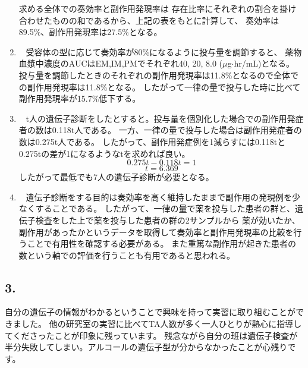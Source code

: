 \documentclass[a4paper,papersize,dvipdfmx]{jsarticle}
\newcommand{\mon}[1]{\item[({#1})] \ }
\begin{document}
\begin{enumerate}
求める全体での奏効率と副作用発現率は
存在比率にそれぞれの割合を掛け合わせたものの和であるから、上記の表をもとに計算して、
奏効率は89.5\%、副作用発現率は27.5\%となる。

\mon{3}
受容体の型に応じて奏効率が80\%になるように投与量を調節すると、
薬物血漿中濃度のAUCはEM,IM,PMでそれぞれ40, 20, 8.0 ($\mu$g$\cdot$hr/mL)となる。
投与量を調節したときのそれぞれの副作用発現率は11.8\%となるので全体での副作用発現率は11.8\%となる。
したがって一律の量で投与した時に比べて副作用発現率が15.7\%低下する。

\mon{4}
t人の遺伝子診断をしたとすると。投与量を個別化した場合での副作用発症者の数は0.118t人である。
一方、一律の量で投与した場合は副作用発症者の数は0.275t人である。
したがって、副作用発症例を1減らすには0.118tと0.275tの差が1になるようなtを求めれば良い。
\[ 0.275t - 0.118t = 1\]
\[t = 6.369\]
したがって最低でも7人の遺伝子診断が必要となる。

\mon{5}
遺伝子診断をする目的は奏効率を高く維持したままで副作用の発現例を少なくすることである。
したがって、一律の量で薬を投与した患者の群と、遺伝子検査をした上で薬を投与した患者の群の2サンプルから
薬が効いたか、副作用があったかというデータを取得して奏効率と副作用発現率の比較を行うことで有用性を確認する必要がある。
また重篤な副作用が起きた患者の数という軸での評価を行うことも有用であると思われる。
\end{enumerate}

\subsection*{3.}
自分の遺伝子の情報がわかるということで興味を持って実習に取り組むことができました。
他の研究室の実習に比べてTA人数が多く一人ひとりが熱心に指導してくださったことが印象に残っています。
残念ながら自分の班は遺伝子検査が半分失敗してしまい。アルコールの遺伝子型が分からなかったことが心残りです。
\end{document}
